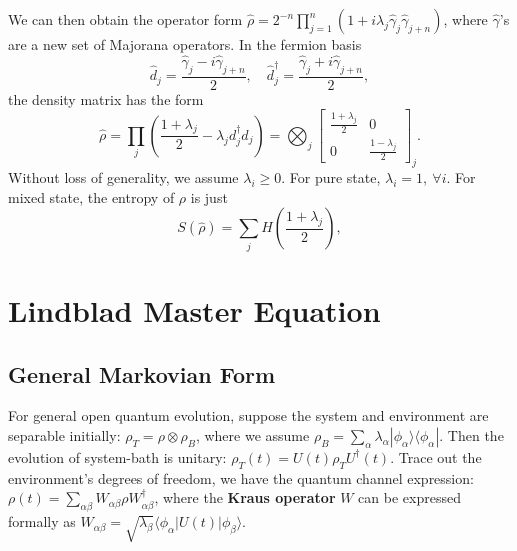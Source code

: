 \documentclass{SciPost}
\begin{document}
We can then obtain the operator form $\hat\rho = 2^{-n} \prod_{j=1}^n(1+i\lambda_j \hat\gamma_j\hat\gamma_{j+n})$, where $\hat \gamma$'s are a new set of Majorana operators. In the fermion basis
\begin{equation}
	\hat d_j = \frac{\hat\gamma_j - i \hat\gamma_{j+n}}{2},\quad
	\hat d_j^\dagger = \frac{\hat\gamma_j + i \hat\gamma_{j+n}}{2},
\end{equation}
the density matrix has the form
\begin{equation}\label{eq:gaussian-std-form}
	\hat\rho
	= \prod_{j}\left(\frac{1+\lambda_j}{2}-\lambda_{j}d_{j}^{\dagger}d_{j}\right) 
	=\bigotimes_j \begin{bmatrix}
		\frac{1+\lambda_j}{2} & 0 \\
		0 & \frac{1-\lambda_j}{2}
	\end{bmatrix}_j.
\end{equation}
Without loss of generality, we assume $\lambda_i \ge 0$. For pure state, $\lambda_i =1,\ \forall i$.
For mixed state, the entropy of $\rho$ is just 
\begin{equation}
	S(\hat\rho)=\sum_j H\left(\frac{1+\lambda_j}{2}\right),
\end{equation}


\section{Lindblad Master Equation}
\subsection{General Markovian Form}
For general open quantum evolution, suppose the system and environment are separable initially: $\rho_T=\rho\otimes\rho_B$, where we assume $\rho_B=\sum_\alpha \lambda_\alpha |\phi_\alpha\rangle\langle\phi_\alpha |$. Then the evolution of system-bath is unitary: $\rho_T(t) = U(t)\rho_TU^\dagger(t)$. Trace out the environment's degrees of freedom, we have the quantum channel expression: $\rho(t) = \sum_{\alpha\beta} W_{\alpha\beta} \rho W^\dagger_{\alpha\beta}$, where the \textbf{Kraus operator} $W$ can be expressed formally as $W_{\alpha\beta} = \sqrt{\lambda_\beta} \langle\phi_\alpha|U(t)|\phi_\beta\rangle$.
\end{document}
